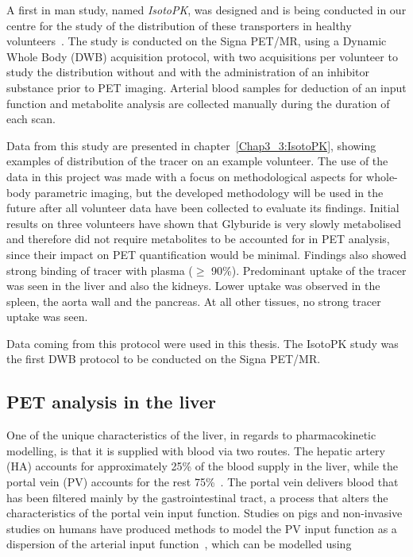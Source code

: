 A first in man study, named \textit{IsotoPK}, was designed and is being conducted in our centre for the study of the distribution of these transporters in healthy volunteers~\cite{Marie2019}.
The study is conducted on the Signa PET/MR, using a Dynamic Whole Body (DWB) acquisition protocol, with two acquisitions per volunteer to study the distribution without and with the administration of an inhibitor substance prior to PET imaging.
Arterial blood samples for deduction of an input function and metabolite analysis are collected manually during the duration of each scan. 

Data from this study are presented in chapter~\ref{Chap3_3:IsotoPK}, showing examples of distribution of the tracer on an example volunteer. The use of the data in this project was made with a focus on methodological aspects for whole-body parametric imaging, but the developed methodology will be used in the future after all volunteer data have been collected to evaluate its findings.
Initial results on three volunteers have shown that Glyburide is very slowly metabolised and therefore did not require metabolites to be accounted for in PET analysis, since their impact on PET quantification would be minimal. Findings also showed strong binding of tracer with plasma ($\geq$ 90\%).
Predominant uptake of the tracer was seen in the liver and also the kidneys. Lower uptake was observed in the spleen, the aorta wall and the pancreas. At all other tissues, no strong tracer uptake was seen.

Data coming from this protocol were used in this thesis. The IsotoPK study was the first DWB protocol to be conducted on the Signa PET/MR. 

\subsection{PET analysis in the liver}
\label{liver_PV_theory}
One of the unique characteristics of the liver, in regards to pharmacokinetic modelling, is that it is supplied with blood via two routes. The hepatic artery (HA) accounts for approximately 25\% of the blood supply in the liver, while the portal vein (PV) accounts for the rest 75\%~\cite{Winterdahl2011}. The portal vein delivers blood that has been filtered mainly by the gastrointestinal tract, a process that alters the characteristics of the portal vein input function. 
Studies on pigs and non-invasive studies on humans have produced methods to model the PV input function as a dispersion of the arterial input function~\cite{Kudomi2008}, which can be modelled using 

